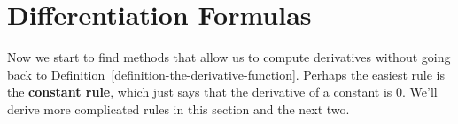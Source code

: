 \documentclass[10pt,]{book}
\newcommand{\terminology}[1]{\textbf{#1}}
\numberwithin{equation}{section}
\begin{document}
\section[{Differentiation Formulas}]{Differentiation Formulas}\label{section-differentiation-formulas}
\begin{introduction}{}%
\hypertarget{p-123}{}%
Now we start to find methods that allow us to compute derivatives without going back to \hyperref[definition-the-derivative-function]{Definition~\ref{definition-the-derivative-function}}. Perhaps the easiest rule is the \terminology{constant rule}, which just says that the derivative of a constant is \(0\). We'll derive more complicated rules in this section and the next two.%
\end{introduction}%
%
%
\typeout{************************************************}
\typeout{************************************************}
%
\end{document}
